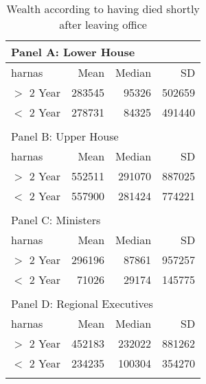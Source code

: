 \begin{table}[ht]
\centering
\begin{tabular}{lrrr}
   
\multicolumn{4}{l}{Panel A: Lower House}\\ 
\hline
harnas & Mean & Median & SD \\\hline

$>$ 2 Year & 283545 & 95326 & 502659 \\ 
  $<$ 2 Year & 278731 & 84325 & 491440 \\ 
   \hline\\ 
\multicolumn{4}{l}{Panel B: Upper House}\\ 
\hline
harnas & Mean & Median & SD \\\hline
$>$ 2 Year & 552511 & 291070 & 887025 \\ 
  $<$ 2 Year & 557900 & 281424 & 774221 \\ 
   \hline\\ 
\multicolumn{4}{l}{Panel C: Ministers}\\ 
\hline
harnas & Mean & Median & SD \\\hline
$>$ 2 Year & 296196 & 87861 & 957257 \\ 
  $<$ 2 Year & 71026 & 29174 & 145775 \\ 
   \hline\\ 
\multicolumn{4}{l}{Panel D: Regional Executives}\\ 
\hline
harnas & Mean & Median & SD \\\hline
$>$ 2 Year & 452183 & 232022 & 881262 \\ 
  $<$ 2 Year & 234235 & 100304 & 354270 \\ 
   \hline
\multicolumn{4}{l}{}\\
\end{tabular}
\caption{Wealth according to having died shortly after leaving office} 
\label{tab:harnas}
\end{table}